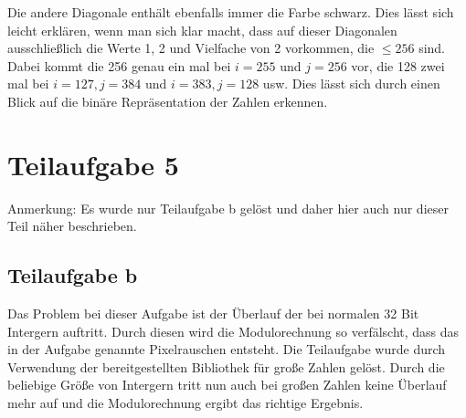 \documentclass[]{article}
\begin{document}
Die andere Diagonale enthält ebenfalls immer die Farbe schwarz. Dies lässt sich leicht erklären, wenn man sich klar macht, dass auf dieser Diagonalen ausschließlich die Werte 1, 2 und Vielfache von 2 vorkommen, die $\leq 256$ sind. Dabei kommt die 256 genau ein mal bei $i = 255$ und $j = 256$ vor, die 128 zwei mal bei $i = 127, j = 384$ und $i = 383, j = 128$ usw. Dies lässt sich durch einen Blick auf die binäre Repräsentation der Zahlen erkennen. 
\section{Teilaufgabe 5}
Anmerkung: Es wurde nur Teilaufgabe b gelöst und daher hier auch nur dieser Teil näher beschrieben.
\subsection{Teilaufgabe b}
Das Problem bei dieser Aufgabe ist der Überlauf der bei normalen 32 Bit Intergern auftritt. Durch diesen wird die Modulorechnung so verfälscht, dass das in der Aufgabe genannte Pixelrauschen entsteht. 
Die Teilaufgabe wurde durch Verwendung der bereitgestellten Bibliothek für große Zahlen gelöst. Durch die beliebige Größe von Intergern tritt nun auch bei großen Zahlen keine Überlauf mehr auf und die Modulorechnung ergibt das richtige Ergebnis.
\end{document}
